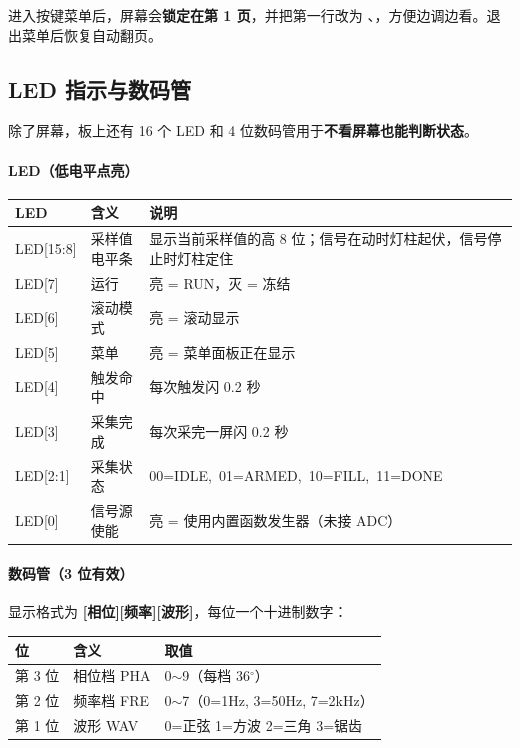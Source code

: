 \documentclass[UTF8,a4paper,11pt]{ctexart}
\begin{document}
\begin{tipbox}
进入按键菜单后，屏幕会\textbf{锁定在第 1 页}，并把第一行改为
、，方便边调边看。退出菜单后恢复自动翻页。
\end{tipbox}

\subsection{LED 指示与数码管}

除了屏幕，板上还有 16 个 LED 和 4 位数码管用于\textbf{不看屏幕也能判断状态}。

\paragraph{LED（低电平点亮）}
\begin{center}
\small
\begin{tabular}{llp{8.2cm}}
\toprule
LED & 含义 & 说明\\
\midrule
LED[15:8] & 采样值电平条 & 显示当前采样值的高 8 位；信号在动时灯柱起伏，信号停止时灯柱定住\\
LED[7] & 运行 & 亮 = RUN，灭 = 冻结\\
LED[6] & 滚动模式 & 亮 = 滚动显示\\
LED[5] & 菜单 & 亮 = 菜单面板正在显示\\
LED[4] & 触发命中 & 每次触发闪 0.2 秒\\
LED[3] & 采集完成 & 每次采完一屏闪 0.2 秒\\
LED[2:1] & 采集状态 & 00=IDLE,\ 01=ARMED,\ 10=FILL,\ 11=DONE\\
LED[0] & 信号源使能 & 亮 = 使用内置函数发生器（未接 ADC）\\
\bottomrule
\end{tabular}
\end{center}

\paragraph{数码管（3 位有效）}
显示格式为 \textbf{[相位][频率][波形]}，每位一个十进制数字：

\begin{center}
\small
\begin{tabular}{lll}
\toprule
位 & 含义 & 取值\\
\midrule
第 3 位 & 相位档 PHA & 0$\sim$9（每档 36$^\circ$）\\
第 2 位 & 频率档 FRE & 0$\sim$7（0=1Hz, 3=50Hz, 7=2kHz）\\
第 1 位 & 波形 WAV & 0=正弦 1=方波 2=三角 3=锯齿\\
\bottomrule
\end{tabular}
\end{center}
\end{document}
